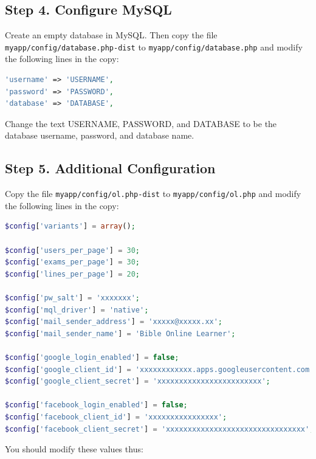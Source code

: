 \documentclass[11pt,oneside,a4paper]{memoir}
\begin{document}
\subsection{Step 4. Configure MySQL}\label{sec-database-php}

Create an empty database in MySQL. Then copy the file
\texttt{myapp/config/database.php-dist} to \texttt{myapp/config/database.php} and modify the
following lines in the copy:

\begin{lstlisting}[language=PHP]
'username' => 'USERNAME',
'password' => 'PASSWORD',
'database' => 'DATABASE',
\end{lstlisting}

Change the text USERNAME, PASSWORD, and DATABASE to be the database username, password, and database
name.


\subsection{Step 5. Additional Configuration}\label{sec-ol-config}

Copy the file \texttt{myapp/config/ol.php-dist} to \texttt{myapp/config/ol.php} and modify the
following lines in the copy:

\begin{lstlisting}[language=PHP]
$config['variants'] = array();

$config['users_per_page'] = 30;
$config['exams_per_page'] = 30;
$config['lines_per_page'] = 20;

$config['pw_salt'] = 'xxxxxxx';
$config['mql_driver'] = 'native';
$config['mail_sender_address'] = 'xxxxx@xxxxx.xx';
$config['mail_sender_name'] = 'Bible Online Learner';

$config['google_login_enabled'] = false;
$config['google_client_id'] = 'xxxxxxxxxxxx.apps.googleusercontent.com';
$config['google_client_secret'] = 'xxxxxxxxxxxxxxxxxxxxxxxx';

$config['facebook_login_enabled'] = false;
$config['facebook_client_id'] = 'xxxxxxxxxxxxxxxx';
$config['facebook_client_secret'] = 'xxxxxxxxxxxxxxxxxxxxxxxxxxxxxxxx';
\end{lstlisting}

You should modify these values thus:
\end{document}
